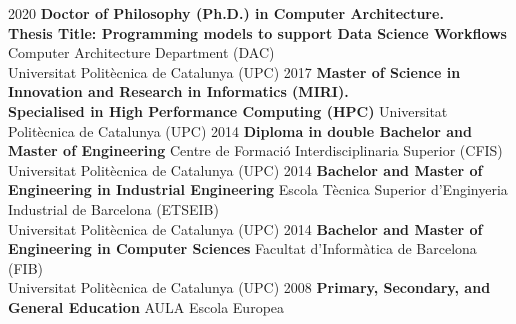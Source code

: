 %
%
%


\vspace{0.3em}

\begin{scholarship}
    \scholarshipentry
        {2020}
        {\textbf{Doctor of Philosophy (Ph.D.) in Computer Architecture.} \\ \textbf{Thesis Title: Programming models to support Data Science Workflows}}
        {Computer Architecture Department (DAC) \\ Universitat Politècnica de Catalunya (UPC)}
    \scholarshipentry
        {2017}
        {\textbf{Master of Science in Innovation and Research in Informatics (MIRI).} \\ \textbf{Specialised in High Performance Computing (HPC)}}
        {Universitat Politècnica de Catalunya (UPC)}
    \scholarshipentry
        {2014}
        {\textbf{Diploma in double Bachelor and Master of Engineering}}
        {Centre de Formació Interdisciplinaria Superior (CFIS) \\ Universitat Politècnica de Catalunya (UPC)}
    \scholarshipentry
        {2014}
        {\textbf{Bachelor and Master of Engineering in Industrial Engineering}}
        {Escola Tècnica Superior d'Enginyeria Industrial de Barcelona (ETSEIB) \\ Universitat Politècnica de Catalunya (UPC)}
    \scholarshipentry
        {2014}
        {\textbf{Bachelor and Master of Engineering in Computer Sciences}}
        {Facultat d'Informàtica de Barcelona (FIB) \\ Universitat Politècnica de Catalunya (UPC)}
    \scholarshipentry
        {2008}
        {\textbf{Primary, Secondary, and General Education}}
        {AULA Escola Europea}
\end{scholarship}

\vspace{-0.3em}
